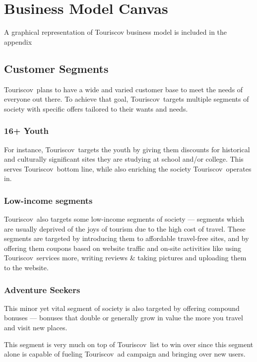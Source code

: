 \documentclass[12pt]{article}
\newcommand{\tco}{Touriscov}
\begin{document}
\newpage

\section{Business Model Canvas}
A graphical representation of Touriscov business model is included in the appendix \par

\subsection{Customer Segments}
\tco\ plans to have a wide and varied customer base to meet the needs of everyone out there. To achieve that goal, \tco\  targets multiple segments of society with specific offers tailored to their wants and needs.\ \par 

\subsubsection{16+ Youth}
For instance, \tco\ targets the youth by giving them discounts for historical and culturally significant sites they are studying at school and/or college. This serves \tco\ bottom line, while also enriching the society \tco\ operates in.\ \par

\subsubsection{Low-income segments}
\tco\ also targets some low-income segments of society --- segments which are usually deprived of the joys of tourism due to the high cost of travel. These segments are targeted by introducing them to affordable travel-free sites, and by offering them coupons based on website traffic and on-site activities like using \tco\ services more, writing reviews \& taking pictures and uploading them to the website.\ \par 

\subsubsection{Adventure Seekers}
This minor yet vital segment of society is also targeted by offering compound bonuses --- bonuses that double or generally grow in value the more you travel and visit new places.\ \par
\noindent
This segment is very much on top of \tco\ list to win over since this segment alone is capable of fueling \tco\ ad campaign and bringing over new users.\ \par
\end{document}

